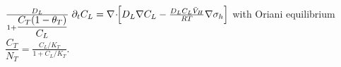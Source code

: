 \documentclass{article}
\begin{document}
\(\frac{D_L}{1+\dfrac{C_T(1-\theta_T)}{C_L}}\;\partial_t C_L = \nabla\!\cdot\!\!\Bigl[D_L\nabla C_L - \frac{D_L C_L\bar V_H}{R T}\nabla\sigma_h\Bigr]\) with Oriani equilibrium \(\dfrac{C_T}{N_T}=\frac{C_L/K_T}{1+C_L/K_T}\).
\end{document}
